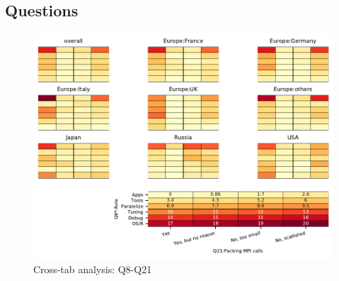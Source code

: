 
\subsection{Questions}


\begin{figure}
\begin{center}
\includegraphics[width=12cm]{../pdfs/Q8-Q21.pdf}
\caption{Cross-tab analysis: Q8-Q21}
\label{fig:Q8-Q21}
\end{center}
\end{figure}
